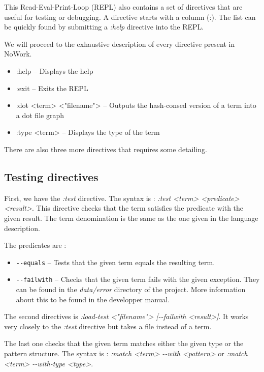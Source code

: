 \documentclass[12pt,a4paper]{article}
\begin{document}
This Read-Eval-Print-Loop (REPL) also contains a set of directives
that are useful for testing or debugging. A directive starts with a
column (:). The list can be quickly found by submitting a \emph{:help}
directive into the REPL.

We will proceed to the exhaustive description of every directive
present in NoWork.

\begin{itemize}
  \item :help -- Displays the help
  \item :exit -- Exits the REPL
  \item :dot <term> <"filename"> -- Outputs the hash-consed version of
    a term into a dot file graph
  \item :type <term> -- Displays the type of the term
\end{itemize}

There are also three more directives that requires some detailing.

\subsection{Testing directives}

First, we have the \emph{:test} directive. The syntax is : \emph{:test
  <term> <predicate> <result>}. This directive checks that the term
satisfies the predicate with the given result. The term denomination
is the same as the one given in the language description.

The predicates are : 
\begin{itemize}
\item \texttt{-{}-equals} -- Tests that the given term equals the resulting term.
\item \texttt{-{}-failwith} -- Checks that the given term fails with the
  given exception. They can be found in the \emph{data/error}
  directory of the project. More information about this to be found in
  the developper manual.
\end{itemize}

The second directives is \emph{:load-test <"filename"> [-{}-failwith
  <result>]}. It works very closely to the \emph{:test} directive but
takes a file instead of a term.

The last one checks that the given term matches either the given type
or the pattern structure. The syntax is : \emph{:match <term> -{}-with
  <pattern>} or \emph{:match <term> -{}-with-type <type>}.
\end{document}
